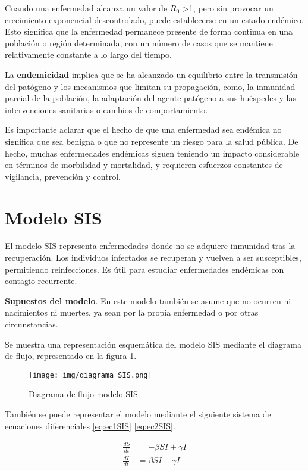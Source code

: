 Cuando una enfermedad alcanza un valor de $R_0$ >1, pero sin provocar un crecimiento exponencial descontrolado, puede establecerse en un estado endémico. Esto significa que la enfermedad permanece presente de forma continua en una población o región determinada, con un número de casos que se mantiene relativamente constante a lo largo del tiempo.

La \textbf{endemicidad} implica que se ha alcanzado un equilibrio entre la transmisión del patógeno y los mecanismos que limitan su propagación, como, la inmunidad parcial de la población, la adaptación del agente patógeno a sus huéspedes y las intervenciones sanitarias o cambios de comportamiento.

Es importante aclarar que el hecho de que una enfermedad sea endémica no significa que sea benigna o que no represente un riesgo para la salud pública. De hecho, muchas enfermedades endémicas siguen teniendo un impacto considerable en términos de morbilidad y mortalidad, y requieren esfuerzos constantes de vigilancia, prevención y control.

\section{Modelo SIS}
El modelo SIS representa enfermedades donde no se adquiere inmunidad tras la recuperación. Los individuos infectados se recuperan y vuelven a ser susceptibles, permitiendo reinfecciones. Es útil para estudiar enfermedades endémicas con contagio recurrente.

\textbf{Supuestos del modelo}. En este modelo también se asume que no ocurren ni nacimientos ni muertes, ya sean por la propia enfermedad o por otras circunstancias.

Se muestra una representación esquemática del modelo SIS mediante el diagrama de flujo, representado en la figura \ref{fig:diagrama SIS}.
\begin{figure}[H]
    \centering
    \texttt{[image: img/diagrama\_SIS.png]}
    \caption{Diagrama de flujo modelo SIS.}
    \label{fig:diagrama SIS}
    \vspace{0.5cm} %
\end{figure}

También se puede representar el modelo mediante el siguiente sistema de ecuaciones diferenciales \eqref{eq:ec1SIS} \eqref{eq:ec2SIS}.

\begin{align}
\frac{dS}{dt} &= -\beta SI + \gamma I \label{eq:ec1SIS} \\
\frac{dI}{dt} &= \beta SI - \gamma I \label{eq:ec2SIS}
\end{align}

